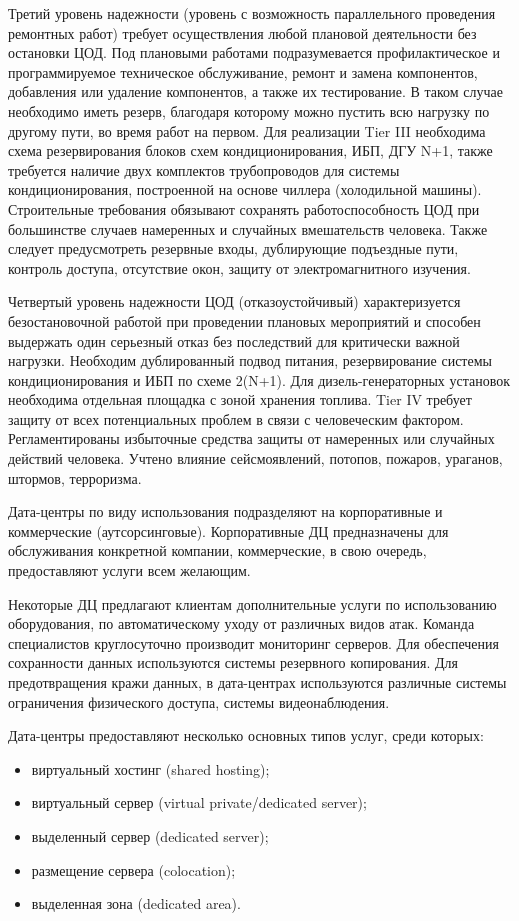 Третий уровень надежности (уровень с возможность параллельного проведения ремонтных работ) требует осуществления любой плановой деятельности без остановки ЦОД.
Под плановыми работами подразумевается профилактическое и программируемое техническое обслуживание, ремонт и замена компонентов, добавления или удаление компонентов, а также их тестирование.
В таком случае необходимо иметь резерв, благодаря которому можно пустить всю нагрузку по другому пути, во время работ на первом.
Для реализации Tier III необходима схема резервирования блоков схем кондиционирования, ИБП, ДГУ N+1, также требуется наличие двух комплектов трубопроводов для системы кондиционирования, построенной на основе чиллера (холодильной машины).
Строительные требования обязывают сохранять работоспособность ЦОД при большинстве случаев намеренных и случайных вмешательств человека.
Также следует предусмотреть резервные входы, дублирующие подъездные пути, контроль доступа, отсутствие окон, защиту от электромагнитного изучения.

Четвертый уровень надежности ЦОД (отказоустойчивый) характеризуется безостановочной работой при проведении плановых мероприятий и способен выдержать один серьезный отказ без последствий для критически важной нагрузки.
Необходим дублированный подвод питания, резервирование системы кондиционирования и ИБП по схеме 2(N+1).
Для дизель-генераторных установок необходима отдельная площадка с зоной хранения топлива.
Tier IV требует защиту от всех потенциальных проблем в связи с человеческим фактором.
Регламентированы избыточные средства защиты от намеренных или случайных действий человека.
Учтено влияние сейсмоявлений, потопов, пожаров, ураганов, штормов, терроризма.

Дата-центры по виду использования подразделяют на корпоративные и коммерческие (аутсорсинговые).
Корпоративные ДЦ предназначены для обслуживания конкретной компании, коммерческие, в свою очередь, предоставляют услуги всем желающим.

Некоторые ДЦ предлагают клиентам дополнительные услуги по использованию оборудования, по автоматическому уходу от различных видов атак.
Команда специалистов круглосуточно производит мониторинг серверов.
Для обеспечения сохранности данных используются системы резервного копирования.
Для предотвращения кражи данных, в дата-центрах используются различные системы ограничения физического доступа, системы видеонаблюдения.

Дата-центры предоставляют несколько основных типов услуг, среди которых:
\begin{itemize}
  \item виртуальный хостинг (shared hosting);
  \item виртуальный сервер (virtual private/dedicated server);
  \item выделенный сервер (dedicated server);
  \item размещение сервера (colocation);
  \item выделенная зона (dedicated area).
\end{itemize}

